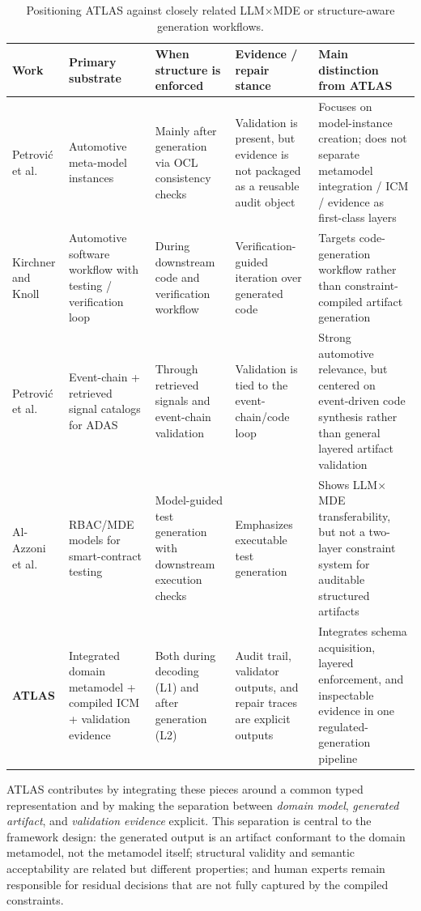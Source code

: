 \documentclass[acmlarge,nonacm]{acmart}
\theoremstyle{acmplain}
\theoremstyle{acmdefinition}
\begin{document}
\begin{table}[!htbp]
\centering
\small
\caption{Positioning ATLAS against closely related LLM$\times$MDE or structure-aware generation workflows.}
\label{tab:related-positioning}
\begin{tabular}{@{}p{1.5cm}p{2.3cm}p{2.9cm}p{2.9cm}p{4.5cm}@{}}
\toprule
\textbf{Work} & \textbf{Primary substrate} & \textbf{When structure is enforced} & \textbf{Evidence / repair stance} & \textbf{Main distinction from ATLAS}\\
\midrule
Petrovi\'{c} et al.~\cite{Petrovic_2024} & Automotive meta-model instances & Mainly after generation via OCL consistency checks & Validation is present, but evidence is not packaged as a reusable audit object & Focuses on model-instance creation; does not separate metamodel integration / ICM / evidence as first-class layers\\
Kirchner and Knoll~\cite{Kirchner2025AutoCode} & Automotive software workflow with testing / verification loop & During downstream code and verification workflow & Verification-guided iteration over generated code & Targets code-generation workflow rather than constraint-compiled artifact generation\\
Petrovi\'{c} et al.~\cite{Petrovic2025EventChainADAS} & Event-chain + retrieved signal catalogs for ADAS & Through retrieved signals and event-chain validation & Validation is tied to the event-chain/code loop & Strong automotive relevance, but centered on event-driven code synthesis rather than general layered artifact validation\\
Al-Azzoni et al.~\cite{AlAzzoni2026SmartContractTest} & RBAC/MDE models for smart-contract testing & Model-guided test generation with downstream execution checks & Emphasizes executable test generation & Shows LLM$\times$MDE transferability, but not a two-layer constraint system for auditable structured artifacts\\
\textbf{ATLAS} & Integrated domain metamodel + compiled ICM + validation evidence & Both during decoding (L1) and after generation (L2) & Audit trail, validator outputs, and repair traces are explicit outputs & Integrates schema acquisition, layered enforcement, and inspectable evidence in one regulated-generation pipeline\\
\bottomrule
\end{tabular}
\end{table}

ATLAS contributes by integrating these pieces around a common typed representation and by making the separation between \emph{domain model}, \emph{generated artifact}, and \emph{validation evidence} explicit. This separation is central to the framework design: the generated output is an artifact conformant to the domain metamodel, not the metamodel itself; structural validity and semantic acceptability are related but different properties; and human experts remain responsible for residual decisions that are not fully captured by the compiled constraints.
\end{document}

